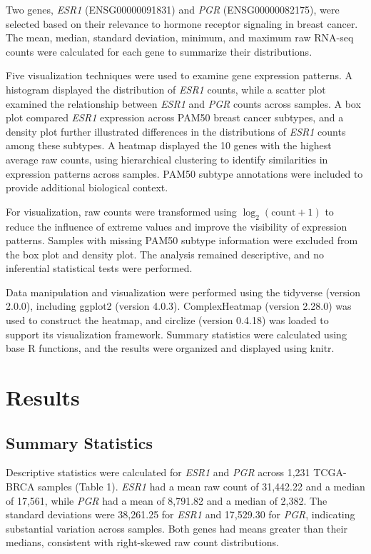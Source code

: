 \documentclass[11pt,letterpaper]{article}
\begin{document}
Two genes, \textit{ESR1} (ENSG00000091831) and \textit{PGR} (ENSG00000082175), were selected based on their relevance to hormone receptor signaling in breast cancer. The mean, median, standard deviation, minimum, and maximum raw RNA-seq counts were calculated for each gene to summarize their distributions.

Five visualization techniques were used to examine gene expression patterns. A histogram displayed the distribution of \textit{ESR1} counts, while a scatter plot examined the relationship between \textit{ESR1} and \textit{PGR} counts across samples. A box plot compared \textit{ESR1} expression across PAM50 breast cancer subtypes, and a density plot further illustrated differences in the distributions of \textit{ESR1} counts among these subtypes. A heatmap displayed the 10 genes with the highest average raw counts, using hierarchical clustering to identify similarities in expression patterns across samples. PAM50 subtype annotations were included to provide additional biological context.

For visualization, raw counts were transformed using $\log_2(\mathrm{count}+1)$ to reduce the influence of extreme values and improve the visibility of expression patterns. Samples with missing PAM50 subtype information were excluded from the box plot and density plot. The analysis remained descriptive, and no inferential statistical tests were performed.

Data manipulation and visualization were performed using the tidyverse (version 2.0.0), including ggplot2 (version 4.0.3). ComplexHeatmap (version 2.28.0) was used to construct the heatmap, and circlize (version 0.4.18) was loaded to support its visualization framework. Summary statistics were calculated using base R functions, and the results were organized and displayed using knitr.

\section{Results}
\subsection{Summary Statistics}
Descriptive statistics were calculated for \textit{ESR1} and \textit{PGR} across 1,231 TCGA-BRCA samples (Table 1). \textit{ESR1} had a mean raw count of 31,442.22 and a median of 17,561, while \textit{PGR} had a mean of 8,791.82 and a median of 2,382. The standard deviations were 38,261.25 for \textit{ESR1} and 17,529.30 for \textit{PGR}, indicating substantial variation across samples. Both genes had means greater than their medians, consistent with right-skewed raw count distributions.
\end{document}
